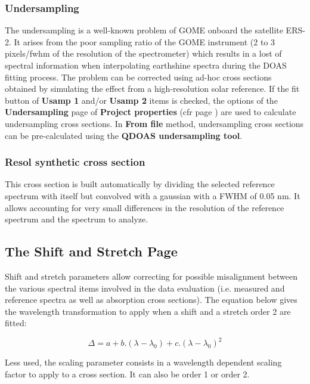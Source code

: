 \subsubsection{Undersampling} \label{sec:undersampling_params}
The undersampling is a well-known problem of GOME onboard the satellite ERS-2. It arises from the poor sampling ratio of the GOME instrument (2 to 3 pixels/\gls{fwhm} of the resolution of the spectrometer) which results in a lost of spectral information when interpolating earthshine spectra during the DOAS fitting process. The problem can be corrected using ad-hoc cross sections obtained by simulating the effect from a high-resolution solar reference. If the fit button of \textbf{Usamp 1} and/or \textbf{Usamp 2} items is checked, the options of the \textbf{Undersampling} page of \textbf{Project properties} (cfr page \pageref{sec:projects_undersampling_page}) are used to calculate undersampling cross sections.  In \textbf{From file} method, undersampling cross sections can be pre-calculated using the \textbf{QDOAS undersampling tool}.

\subsubsection{Resol synthetic cross section}
This cross section is built automatically by dividing the selected reference spectrum with itself but convolved with a gaussian with a FWHM of 0.05 nm.  It allows accounting for very small differences in the resolution of the reference spectrum and the spectrum to analyze.

\subsection{The Shift and Stretch Page} \label{sec:shift_stretch_page}
Shift and stretch parameters allow correcting for possible misalignment between the various spectral items involved in the data evaluation (i.e. measured and reference spectra as well as absorption cross sections). The equation below gives the wavelength transformation to apply when a shift and a stretch order 2 are fitted:

\begin{equation}
\Delta= a+b.(\lambda-\lambda_0)+c.(\lambda-\lambda_0)^2
\end{equation}

Less used, the scaling parameter consists in a wavelength dependent scaling factor to apply to a cross section. It can also be order 1 or order 2.

